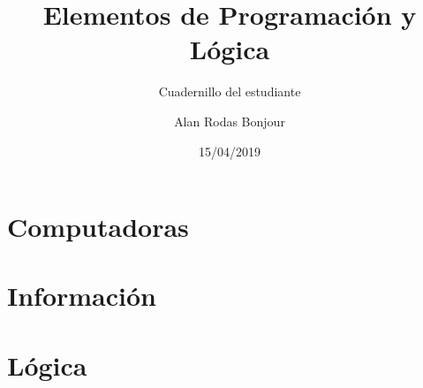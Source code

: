 \documentclass[11pt,fleqn]{book} %
\begin{document}

\title{Elementos de Programación y Lógica}
\subtitle{Cuadernillo del estudiante}
\author{Alan Rodas Bonjour}
\date{15/04/2019}


\maketitle





\setlength{\parskip}{0.5em}




\part{Computadoras}
\label{Computadoras}

\begin{refsection}


\newpage
\printbibliography[heading=subbibliography]
\end{refsection}


\part{Información}
\label{Información}

\begin{refsection}


\newpage
\printbibliography[heading=subbibliography]
\end{refsection}


\part{Lógica}
\label{Lógica}
\end{document}
